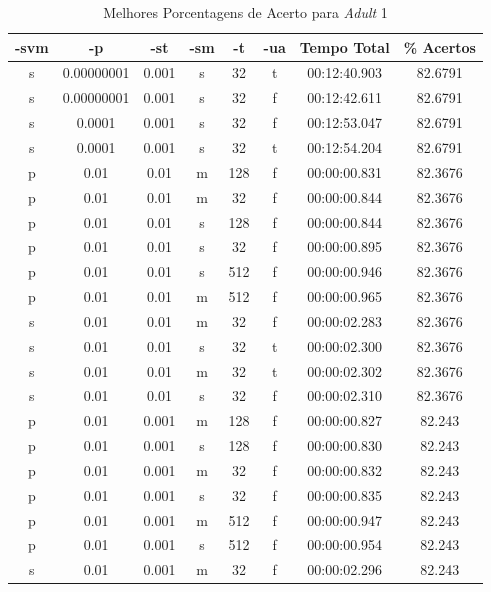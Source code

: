 \begin{table}
    \caption{Melhores Porcentagens de Acerto para \emph{Adult} 1}
    \label{tab:bestResults1a1}
    \small
    \centering
    \begin{tabular}{|c|c|c|c|c|c|c|c|} \hline
		-svm & -p & -st & -sm & -t & -ua & Tempo Total & \% Acertos\\ \hline
		s & 0.00000001 & 0.001 & s & 32 & t & 00:12:40.903 & 82.6791\\ \hline
		s & 0.00000001 & 0.001 & s & 32 & f & 00:12:42.611 & 82.6791\\ \hline
		s & 0.0001 & 0.001 & s & 32 & f & 00:12:53.047 & 82.6791\\ \hline
		s & 0.0001 & 0.001 & s & 32 & t & 00:12:54.204 & 82.6791\\ \hline
		p & 0.01 & 0.01 & m & 128 & f & 00:00:00.831 & 82.3676\\ \hline
		p & 0.01 & 0.01 & m & 32 & f & 00:00:00.844 & 82.3676\\ \hline
		p & 0.01 & 0.01 & s & 128 & f & 00:00:00.844 & 82.3676\\ \hline
		p & 0.01 & 0.01 & s & 32 & f & 00:00:00.895 & 82.3676\\ \hline
		p & 0.01 & 0.01 & s & 512 & f & 00:00:00.946 & 82.3676\\ \hline
		p & 0.01 & 0.01 & m & 512 & f & 00:00:00.965 & 82.3676\\ \hline
		s & 0.01 & 0.01 & m & 32 & f & 00:00:02.283 & 82.3676\\ \hline
		s & 0.01 & 0.01 & s & 32 & t & 00:00:02.300 & 82.3676\\ \hline
		s & 0.01 & 0.01 & m & 32 & t & 00:00:02.302 & 82.3676\\ \hline
		s & 0.01 & 0.01 & s & 32 & f & 00:00:02.310 & 82.3676\\ \hline
		p & 0.01 & 0.001 & m & 128 & f & 00:00:00.827 & 82.243\\ \hline
		p & 0.01 & 0.001 & s & 128 & f & 00:00:00.830 & 82.243\\ \hline
		p & 0.01 & 0.001 & m & 32 & f & 00:00:00.832 & 82.243\\ \hline
		p & 0.01 & 0.001 & s & 32 & f & 00:00:00.835 & 82.243\\ \hline
		p & 0.01 & 0.001 & m & 512 & f & 00:00:00.947 & 82.243\\ \hline
		p & 0.01 & 0.001 & s & 512 & f & 00:00:00.954 & 82.243\\ \hline
		s & 0.01 & 0.001 & m & 32 & f & 00:00:02.296 & 82.243\\ \hline

\end{tabular}
\end{table}
